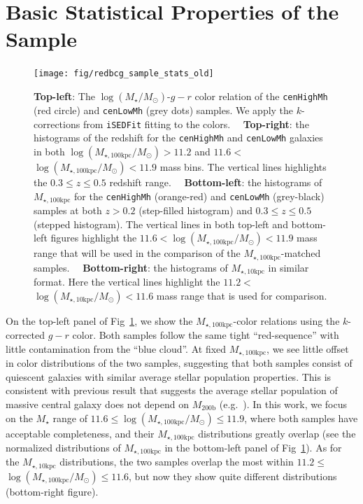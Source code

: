 \documentclass[a4paper,fleqn,usenatbib]{mnras}
\def\rbcg{\texttt{cenHighMh}}
\def\nbcg{\texttt{cenLowMh}}
\def\mstar{{$M_{\star}$}}
\def\mhalo{{$M_{\mathrm{200b}}$}}
\def\logms{{$\log (M_{\star}/M_{\odot})$}}
\def\minn{{$M_{\star,10\mathrm{kpc}}$}}
\def\mtot{{$M_{\star,100\mathrm{kpc}}$}}
\def\logminn{{$\log (M_{\star,10\mathrm{kpc}}/M_{\odot})$}}
\def\logmtot{{$\log (M_{\star,100\mathrm{kpc}}/M_{\odot})$}}
\begin{document}
\appendix


\section{Basic Statistical Properties of the Sample} 
	\label{app:basic} 
    
  \begin{figure}
      \centering 
      \texttt{[image: fig/redbcg\_sample\_stats\_old]}
      \caption{
          \textbf{Top-left}: The \logms{}-$g-r$ color relation of the \rbcg{} 
          (red circle) and \nbcg{} (grey dots) samples.
          We apply the $k$-corrections from \texttt{iSEDFit} fitting to the colors.~~          
          \textbf{Top-right}: the histograms of the redshift for the \rbcg{} and 
          \nbcg{} galaxies in both \logmtot$>11.2$ and $11.6<$\logmtot{}$<11.9$
          mass bins.
          The vertical lines highlights the $0.3\leq z \leq 0.5$ redshift range.~~
          \textbf{Bottom-left}: the histograms of \mtot{} for the \rbcg{} (orange-red) 
          and \nbcg{} (grey-black) samples at both $z>0.2$ (step-filled histogram) and 
          $0.3 \leq z \leq 0.5$ (stepped histogram). 
          The vertical lines in both top-left and bottom-left figures highlight the 
          $11.6<$\logmtot{}$<11.9$ mass range that will be used in the comparison of 
          the \mtot{}-matched samples.~~
          \textbf{Bottom-right}: the histograms of \minn{} in similar format. 
          Here the vertical lines highlight the 
          $11.2<$\logminn{}$<11.6$ mass range that is used for comparison.
      }
      \label{fig:sample_stats}
  \end{figure}

    On the top-left panel of Fig~\ref{fig:sample_stats}, we show the \mtot{}-color 
    relations using the $k$-corrected $g-r$ color. 
    Both samples follow the same tight ``red-sequence'' with little contamination 
    from the ``blue cloud''.
    At fixed \mtot{}, we see little offset in color distributions of the two 
    samples, suggesting that both samples consist of quiescent galaxies with 
    similar average stellar population properties.  
    This is consistent with previous result that suggests the average stellar 
    population of massive central galaxy does not depend on \mhalo{} 
    (e.g.\ \citealt{Park2007}).  
    In this work, we focus on the \mstar{} range of $11.6 \le$\logmtot{}$\le 11.9$, 
    where both samples have acceptable completeness, and their \mtot{} distributions 
    greatly overlap (see the normalized distributions of \mtot{} in the bottom-left 
    panel of Fig~\ref{fig:sample_stats}). 
    As for the \minn{} distributions, the two samples overlap the most within 
    $11.2 \le$\logmtot{}$\le 11.6$, but now they show quite different
    distributions (bottom-right figure).
    
\end{document}
